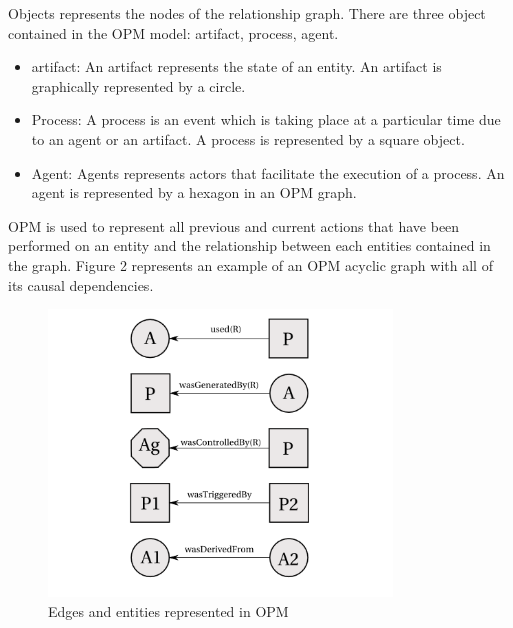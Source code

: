  Objects represents the nodes of the relationship graph. There are three object contained in the OPM model: artifact, process, agent. 

\begin{itemize}
\item
artifact: An artifact represents the state of an entity. An artifact is graphically represented by a circle.

\item
Process: A process is an event which is taking place at a particular time due to an agent or an artifact. A process is represented by a square object.

\item 
Agent: Agents represents actors that facilitate the execution of a process. An agent is represented by a hexagon in an OPM graph.
\end{itemize}

OPM is used to represent all previous and current actions that have been performed on an entity and  the relationship between each entities contained in the graph. Figure 2 represents an example of an OPM acyclic graph with all of its causal dependencies.  

\begin{figure}[h]
\begin{center}
\includegraphics[height=3.0in]{opm_convention.PNG}
\end{center}
\caption{Edges and entities represented in OPM}
\label{autom}
\end{figure}



